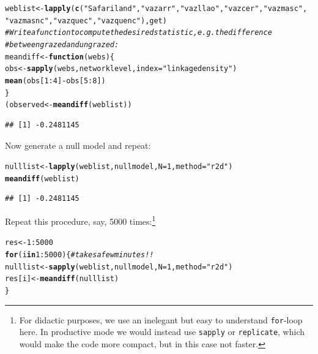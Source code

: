 \documentclass[a4paper, 11pt]{article}\usepackage[]{graphicx}\usepackage[]{color}
\makeatletter
\newcommand{\hlnum}[1]{\textcolor[rgb]{0.686,0.059,0.569}{#1}}%
\newcommand{\hlstr}[1]{\textcolor[rgb]{0.192,0.494,0.8}{#1}}%
\newcommand{\hlcom}[1]{\textcolor[rgb]{0.678,0.584,0.686}{\textit{#1}}}%
\newcommand{\hlopt}[1]{\textcolor[rgb]{0,0,0}{#1}}%
\newcommand{\hlstd}[1]{\textcolor[rgb]{0.345,0.345,0.345}{#1}}%
\newcommand{\hlkwa}[1]{\textcolor[rgb]{0.161,0.373,0.58}{\textbf{#1}}}%
\newcommand{\hlkwb}[1]{\textcolor[rgb]{0.69,0.353,0.396}{#1}}%
\newcommand{\hlkwc}[1]{\textcolor[rgb]{0.333,0.667,0.333}{#1}}%
\newcommand{\hlkwd}[1]{\textcolor[rgb]{0.737,0.353,0.396}{\textbf{#1}}}%
\newenvironment{kframe}{%
 \def\at@end@of@kframe{}%
 \ifinner\ifhmode%
  \def\at@end@of@kframe{\end{minipage}}%
  \begin{minipage}{\columnwidth}%
 \fi\fi%
 \def\FrameCommand##1{\hskip\@totalleftmargin \hskip-\fboxsep
 \colorbox{shadecolor}{##1}\hskip-\fboxsep
     \hskip-\linewidth \hskip-\@totalleftmargin \hskip\columnwidth}%
 \MakeFramed {\advance\hsize-\width
   \@totalleftmargin\z@ \linewidth\hsize
   \@setminipage}}%
 {\par\unskip\endMakeFramed%
 \at@end@of@kframe}
\newenvironment{knitrout}{}{} %
\makeatother
\begin{document}
\begin{knitrout}
\color{fgcolor}\begin{kframe}
\begin{alltt}
\hlstd{weblist} \hlkwb{<-} \hlkwd{lapply}\hlstd{(}\hlkwd{c}\hlstd{(}\hlstr{"Safariland"}\hlstd{,} \hlstr{"vazarr"}\hlstd{,} \hlstr{"vazllao"}\hlstd{,} \hlstr{"vazcer"}\hlstd{,} \hlstr{"vazmasc"}\hlstd{,}
                       \hlstr{"vazmasnc"}\hlstd{,} \hlstr{"vazquec"}\hlstd{,} \hlstr{"vazquenc"}\hlstd{), get)}
\hlcom{# Write a function to compute the desired statistic, e.g. the difference }
\hlcom{# between grazed and ungrazed:}
\hlstd{meandiff} \hlkwb{<-} \hlkwa{function}\hlstd{(}\hlkwc{webs}\hlstd{)\{}
   \hlstd{obs} \hlkwb{<-} \hlkwd{sapply}\hlstd{(webs, networklevel,} \hlkwc{index}\hlstd{=}\hlstr{"linkage density"}\hlstd{)}
   \hlkwd{mean}\hlstd{(obs[}\hlnum{1}\hlopt{:}\hlnum{4}\hlstd{]} \hlopt{-} \hlstd{obs[}\hlnum{5}\hlopt{:}\hlnum{8}\hlstd{])}
\hlstd{\}}
\hlstd{(observed} \hlkwb{<-} \hlkwd{meandiff}\hlstd{(weblist))}
\end{alltt}
\begin{verbatim}
## [1] -0.2481145
\end{verbatim}
\end{kframe}
\end{knitrout}
Now generate a null model and repeat:
\begin{knitrout}
\color{fgcolor}\begin{kframe}
\begin{alltt}
\hlstd{nulllist} \hlkwb{<-} \hlkwd{lapply}\hlstd{(weblist, nullmodel,} \hlkwc{N}\hlstd{=}\hlnum{1}\hlstd{,} \hlkwc{method}\hlstd{=}\hlstr{"r2d"}\hlstd{)}
\hlkwd{meandiff}\hlstd{(weblist)}
\end{alltt}
\begin{verbatim}
## [1] -0.2481145
\end{verbatim}
\end{kframe}
\end{knitrout}
Repeat this procedure, say, 5000 times:\footnote{For didactic purposes, we use an inelegant but easy to understand \texttt{for}-loop here. In productive mode we would instead use \texttt{sapply} or \texttt{replicate}, which would make the code more compact, but in this case not faster.}
\begin{knitrout}
\color{fgcolor}\begin{kframe}
\begin{alltt}
\hlstd{res} \hlkwb{<-} \hlnum{1}\hlopt{:}\hlnum{5000}
\hlkwa{for} \hlstd{(i} \hlkwa{in} \hlnum{1}\hlopt{:}\hlnum{5000}\hlstd{)\{} \hlcom{# takes a few minutes !!}
   \hlstd{nulllist} \hlkwb{<-} \hlkwd{sapply}\hlstd{(weblist, nullmodel,} \hlkwc{N}\hlstd{=}\hlnum{1}\hlstd{,} \hlkwc{method}\hlstd{=}\hlstr{"r2d"}\hlstd{)}
   \hlstd{res[i]} \hlkwb{<-} \hlkwd{meandiff}\hlstd{(nulllist)}
\hlstd{\}}
\end{alltt}
\end{kframe}
\end{knitrout}
\end{document}
